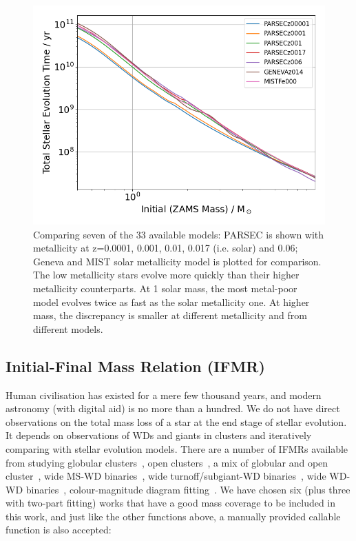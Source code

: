 \documentclass[fleqn,usenatbib]{rasti}
\begin{document}
\begin{figure}
    \centering
    \includegraphics[width=\columnwidth]{total_stellar_lifetime.png}
    \caption{Comparing seven of the 33 available models: PARSEC is shown with
    metallicity at z=0.0001, 0.001, 0.01, 0.017 (i.e. solar) and 0.06; Geneva
    and MIST solar metallicity model is plotted for comparison. The low
    metallicity stars evolve more quickly than their higher metallicity counterparts.
    At 1 solar mass, the most metal-poor model evolves twice as fast as the
    solar metallicity one. At higher mass, the discrepancy is smaller at
    different metallicity and from different models.}
    \label{fig:total_stellar_lifetime}
\end{figure}


\subsection{Initial-Final Mass Relation (IFMR)}
Human civilisation has existed for a mere few thousand years, and modern
astronomy (with digital aid) is no more than a hundred. We do not have direct
observations on the total mass loss of a star at the end stage of stellar
evolution. It depends on observations of WDs and giants in clusters and
iteratively comparing with stellar evolution models. There are a number of
IFMRs available from studying globular clusters~\citep{2004A&A...420..515M,
2009ApJ...705..408K}, open clusters~\citep{2009ApJ...693..355W,
2016ApJ...818...84C}, a mix of globular and open
cluster~\citep{2018ApJ...866...21C}, wide MS-WD
binaries~\citep{2008A&A...477..213C, 2012ApJ...746..144Z}, wide
turnoff/subgiant-WD binaries~\citep{2021ApJ...923..181B}, wide WD-WD
binaries~\citep{2015ASPC..493..325C, 2015ApJ...815...63A}, colour-magnitude
diagram fitting~\citep{2018ApJ...860L..17E}. We have chosen six (plus three
with two-part fitting) works that have a good mass coverage to be included
in this work, and just like the other functions above, a manually provided
callable function is also accepted:
\end{document}
